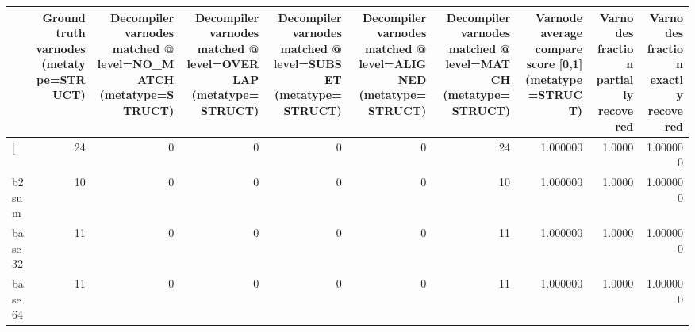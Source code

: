 \begin{tabular}{lrrrrrrrrr}
\toprule
{} &  Ground truth varnodes (metatype=STRUCT) &  Decompiler varnodes matched @ level=NO\_MATCH (metatype=STRUCT) &  Decompiler varnodes matched @ level=OVERLAP (metatype=STRUCT) &  Decompiler varnodes matched @ level=SUBSET (metatype=STRUCT) &  Decompiler varnodes matched @ level=ALIGNED (metatype=STRUCT) &  Decompiler varnodes matched @ level=MATCH (metatype=STRUCT) &  Varnode average compare score [0,1] (metatype=STRUCT) &  Varnodes fraction partially recovered &  Varnodes fraction exactly recovered \\
\midrule
[         &                                       24 &                                                  0 &                                                  0 &                                                  0 &                                                  0 &                                                 24 &                                           1.000000 &                                 1.0000 &                             1.000000 \\
b2sum     &                                       10 &                                                  0 &                                                  0 &                                                  0 &                                                  0 &                                                 10 &                                           1.000000 &                                 1.0000 &                             1.000000 \\
base32    &                                       11 &                                                  0 &                                                  0 &                                                  0 &                                                  0 &                                                 11 &                                           1.000000 &                                 1.0000 &                             1.000000 \\
base64    &                                       11 &                                                  0 &                                                  0 &                                                  0 &                                                  0 &                                                 11 &                                           1.000000 &                                 1.0000 &                             1.000000 \\

\end{tabular}
